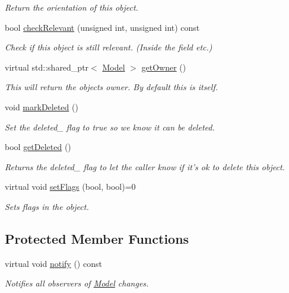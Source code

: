 \begin{DoxyCompactItemize}
\begin{DoxyCompactList}\small\item\em \-Return the orientation of this object. \end{DoxyCompactList}\item 
bool \hyperlink{classmodels_1_1Model_af156332192e292c757dee4a3af461f2e}{check\-Relevant} (unsigned int, unsigned int) const 
\begin{DoxyCompactList}\small\item\em \-Check if this object is still relevant. (\-Inside the field etc.) \end{DoxyCompactList}\item 
virtual std\-::shared\-\_\-ptr$<$ \hyperlink{classmodels_1_1Model}{\-Model} $>$ \hyperlink{classmodels_1_1Model_a4e7847ad26d3a0c56a92b65e02c69066}{get\-Owner} ()
\begin{DoxyCompactList}\small\item\em \-This will return the objects owner. \-By default this is itself. \end{DoxyCompactList}\item 
void \hyperlink{classmodels_1_1Model_a874a270428e7809f3826d826cea78f84}{mark\-Deleted} ()
\begin{DoxyCompactList}\small\item\em \-Set the deleted\-\_\- flag to true so we know it can be deleted. \end{DoxyCompactList}\item 
bool \hyperlink{classmodels_1_1Model_a8e6993606e4cd7c40210a748d8b85f28}{get\-Deleted} ()
\begin{DoxyCompactList}\small\item\em \-Returns the deleted\-\_\- flag to let the caller know if it's ok to delete this object. \end{DoxyCompactList}\item 
virtual void \hyperlink{classmodels_1_1Model_a6d7b6dcb496d16d11b0d0e47a0e0a57e}{set\-Flags} (bool, bool)=0
\begin{DoxyCompactList}\small\item\em \-Sets flags in the object. \end{DoxyCompactList}\end{DoxyCompactItemize}
\subsection*{\-Protected \-Member \-Functions}
\begin{DoxyCompactItemize}
\item 
virtual void \hyperlink{classmodels_1_1Model_a90376864f1df50fc813d8ef472382727}{notify} () const 
\begin{DoxyCompactList}\small\item\em \-Notifies all observers of \hyperlink{classmodels_1_1Model}{\-Model} changes. \end{DoxyCompactList}\end{DoxyCompactItemize}
